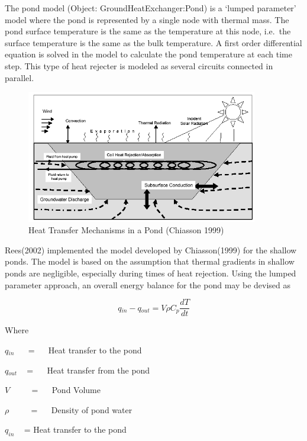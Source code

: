 The pond model (Object: GroundHeatExchanger:Pond) is a `lumped parameter' model where the pond is represented by a single node with thermal mass. The pond surface temperature is the same as the temperature at this node, i.e.~the surface temperature is the same as the bulk temperature. A first order differential equation is solved in the model to calculate the pond temperature at each time step. This type of heat rejecter is modeled as several circuits connected in parallel.

\begin{figure}[hbtp] %
\centering
\includegraphics[width=0.9\textwidth, height=0.9\textheight, keepaspectratio=true]{media/image5676.png}
\caption{Heat Transfer Mechanisms in a Pond (Chiasson 1999) \protect \label{fig:heat-transfer-mechanisms-in-a-pond-chiasson}}
\end{figure}

Rees(2002) implemented the model developed by Chiasson(1999) for the shallow ponds. The model is based on the assumption that thermal gradients in shallow ponds are negligible, especially during times of heat rejection. Using the lumped parameter approach, an overall energy balance for the pond may be devised as

\begin{equation}
q{}_{in} - q{}_{out} = V\rho C{}_p\frac{{dT}}{{dt}}
\end{equation}

Where

\(q{}_{in}\) ~~ = ~~ Heat transfer to the pond

\(q{}_{out}\) ~ = ~~ Heat transfer from the pond

\(V\) ~~~~ = ~~ Pond Volume

\(\rho\) ~~~~ = ~~ Density of pond water

\({q_{in}}\) ~ = Heat transfer to the pond

